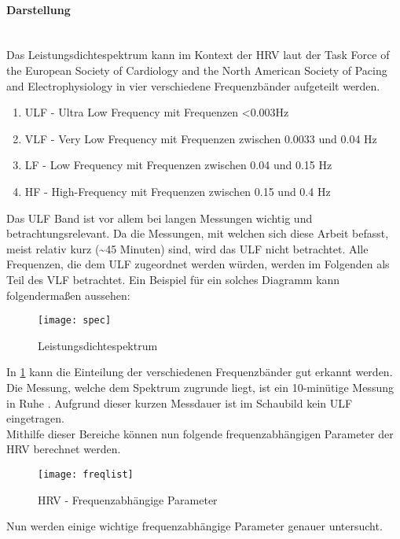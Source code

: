  \paragraph{Darstellung}\mbox{} \\
 Das Leistungsdichtespektrum kann im Kontext der HRV laut der Task Force of the European Society of Cardiology and the North American Society of Pacing and Electrophysiology \cite{deffreq} in vier verschiedene Frequenzbänder aufgeteilt werden.\cite[S.5]{med}
 
 \begin{enumerate}
 	\item ULF - Ultra Low Frequency mit Frequenzen <0.003Hz
 	\item VLF - Very Low Frequency mit Frequenzen zwischen 0.0033 und 0.04 Hz
 	\item LF - Low Frequency mit Frequenzen zwischen 0.04 und 0.15 Hz
 	\item HF - High-Frequency mit Frequenzen zwischen 0.15 und 0.4 Hz
 \end{enumerate}
 
 Das ULF Band ist vor allem bei langen Messungen wichtig und betrachtungsrelevant. Da die Messungen, mit welchen sich diese Arbeit befasst, meist relativ kurz (\textasciitilde 45 Minuten) sind, wird das ULF nicht betrachtet. Alle Frequenzen, die dem ULF zugeordnet werden würden, werden im Folgenden als Teil des VLF betrachtet. Ein Beispiel für ein solches Diagramm kann folgendermaßen aussehen:
 
 \begin{figure}[H]
 	\centering
 	\texttt{[image: spec]}
 	\caption{Leistungsdichtespektrum}
 	\label{fig:spec}
 	\cite{freque}
 \end{figure}

 
 In \ref{fig:spec} kann die Einteilung der verschiedenen Frequenzbänder gut erkannt werden. Die Messung, welche dem Spektrum zugrunde liegt, ist ein 10-minütige Messung in Ruhe \cite{freque}. Aufgrund dieser kurzen Messdauer ist im Schaubild kein ULF eingetragen. \\
 
 Mithilfe dieser Bereiche können nun folgende frequenzabhängigen Parameter der HRV berechnet werden. 
 \begin{figure}[H]
 	\centering
 	\texttt{[image: freqlist]}
 	\caption{HRV - Frequenzabhängige Parameter}
 	\label{fig:freqpic}
 	\cite[S.2]{med}
 \end{figure}
 Nun werden einige wichtige frequenzabhängige Parameter genauer untersucht.
 
